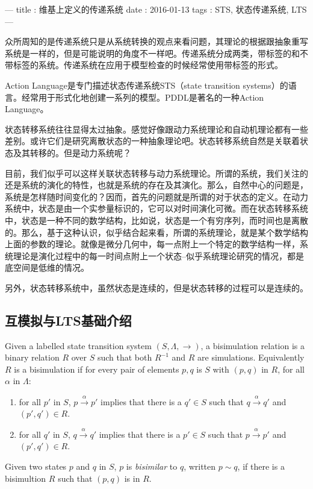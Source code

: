 ---
title : 维基上定义的传递系统
date : 2016-01-13
tags : STS, 状态传递系统, LTS
---

众所周知的是传递系统只是从系统转换的观点来看问题，其理论的根据跟抽象重写系统是一样的，但是可能说明的角度不一样吧。传递系统分成两类，带标签的和不带标签的系统。传递系统在应用于模型检查的时候经常使用带标签的形式。

Action Language是专门描述状态传递系统STS（state transition systems）的语言。经常用于形式化地创建一系列的模型。PDDL是著名的一种Action Language。

状态转移系统往往显得太过抽象。感觉好像跟动力系统理论和自动机理论都有一些差别。或许它们是研究离散状态的一种抽象理论吧。状态转移系统自然是关联着状态及其转移的。但是动力系统呢？

目前，我们似乎可以这样关联状态转移与动力系统理论。所谓的系统，我们关注的还是系统的演化的特性，也就是系统的存在及其演化。那么，自然中心的问题是，系统是怎样随时间变化的？因而，首先的问题就是所谓的对于状态的定义。在动力系统中，状态是由一个实参量标识的，它可以对时间演化可微。而在状态转移系统中，状态是一种不同的数学结构，比如说，状态是一个有穷序列，而时间也是离散的。那么，基于这种认识，似乎结合起来看，所谓的系统理论，就是某个数学结构上面的参数的理论。就像是微分几何中，每一点附上一个特定的数学结构一样，系统理论是演化过程中的每一时间点附上一个状态--似乎系统理论研究的情况，都是底空间是低维的情况。

另外，状态转移系统中，虽然状态是连续的，但是状态转移的过程可以是连续的。

\subsection{互模拟与LTS基础介绍}

\begin{definition}[Bisimulation]
Given a labelled state transition system $(S,\Lambda, \to)$, a bisimulation relation is a binary relation $R$ over $S$ such that both $R^{-1}$ and $R$ are simulations. Equivalently $R$ is a bisimulation if for every pair of elements $p,q$ is $S$ with $(p,q)$ in $R$, for all $\alpha$ in $\Lambda$:
\begin{enumerate}
\item for all $p'$ in $S$, $p\overset{\alpha}{\rightarrow} p'$ implies that there is a $q' \in S$ such that $q \overset{\alpha}{\rightarrow} q'$ and $(p', q')\in R$.
\item for all $q'$ in $S$, $q\overset{\alpha}{\rightarrow} q'$ implies that there is a $p' \in S$ such that $p \overset{\alpha}{\rightarrow} p'$ and $(p', q')\in R$.
\end{enumerate}
\end{definition}
Given two states $p$ and $q$ in $S$, $p$ is \emph{bisimilar} to $q$, written $p \sim q$,  if there is a bisimultion $R$ such that $(p,q)$ is in $R$.

